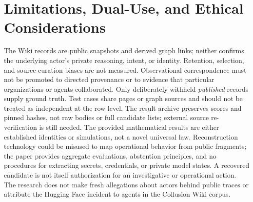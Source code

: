 \documentclass[10pt,twocolumn]{article}
\begin{document}
\section{Limitations, Dual-Use, and Ethical Considerations}
The Wiki records are public snapshots and derived graph links; neither confirms the underlying actor's private reasoning, intent, or identity. Retention, selection, and source-curation biases are not measured. Observational correspondence must not be promoted to directed provenance or to evidence that particular organizations or agents collaborated. Only deliberately withheld \emph{published} records supply ground truth. Test cases share pages or graph sources and should not be treated as independent at the row level. The result archive preserves scores and pinned hashes, not raw bodies or full candidate lists; external source re-verification is still needed. The provided mathematical results are either established identities or simulations, not a novel universal law. Reconstruction technology could be misused to map operational behavior from public fragments; the paper provides aggregate evaluations, abstention principles, and no procedures for extracting secrets, credentials, or private model states. A recovered candidate is not itself authorization for an investigative or operational action. The research does not make fresh allegations about actors behind public traces or attribute the Hugging Face incident to agents in the Collusion Wiki corpus.
\end{document}
